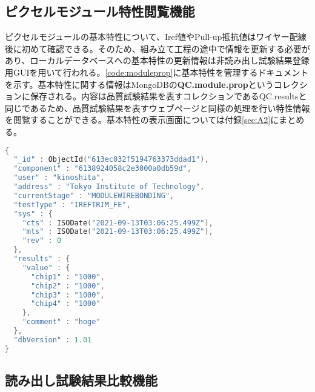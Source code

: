 \subsection{ピクセルモジュール特性閲覧機能}
\label{sec:prop-view}

ピクセルモジュールの基本特性について、Iref値やPull-up抵抗値はワイヤー配線後に初めて確認できる。そのため、組み立て工程の途中で情報を更新する必要があり、ローカルデータベースへの基本特性の更新情報は非読み出し試験結果登録用GUIを用いて行われる。\cref{code:moduleprop}に基本特性を管理するドキュメントを示す。基本特性に関する情報はMongoDBの\textbf{QC.module.prop}というコレクションに保存される。内容は品質試験結果を表すコレクションであるQC.resultsと同じであるため、品質試験結果を表すウェブページと同様の処理を行い特性情報を閲覧することができる。基本特性の表示画面については付録\ref{sec:A2}にまとめる。

\begin{lstlisting}[caption=ピクセルモジュールの基本特定更新情報を表すドキュメント。,label=code:moduleprop, language=C++]
{
  "_id" : ObjectId("613ec032f5194763373ddad1"),
  "component" : "6138924058c2e3000a0db59d",
  "user" : "kinoshita",
  "address" : "Tokyo Institute of Technology",
  "currentStage" : "MODULEWIREBONDING",
  "testType" : "IREFTRIM_FE",
  "sys" : {
    "cts" : ISODate("2021-09-13T03:06:25.499Z"),
    "mts" : ISODate("2021-09-13T03:06:25.499Z"),
    "rev" : 0
  },
  "results" : {
    "value" : {
      "chip1" : "1000",
      "chip2" : "1000",
      "chip3" : "1000",
      "chip4" : "1000"
    },
    "comment" : "hoge"
  },
  "dbVersion" : 1.01
}
\end{lstlisting}

\subsection{読み出し試験結果比較機能}
\label{sec:elec-hikaku}

